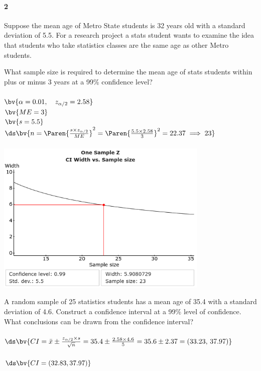\documentclass{article}
\begin{document}
\begin{flushleft}
\paragraph{2} Suppose the mean age of Metro State students is 32 years old with a standard deviation of 5.5. For a research project a stats student wants to examine the idea that students who take statistics classes are the same age as other Metro students. 
\begin{enumalpha}
\item What sample size is required to determine the mean age of stats students within plus or minus 3 years at a 99\% confidence level?\\
\medskip
{}\\
$\bv{\alpha = 0.01, \quad z_{\alpha/2} = 2.58}$\\
$\bv{ME = 3}$\\
$\bv{s = 5.5}$\\ \bigskip
$\ds \bv{n = \Paren{\frac{s \times z_{\alpha/2}}{ME}}^2 = \Paren{\frac{5.5 \times 2.58}{3}}^2 = 22.37 \implies 23}$\\
\vspace{0.5in}
\\
\includegraphics[width=4in]{images/grp08_Q2_a}

\newpage
\item A random sample of 25 statistics students has a mean age of 35.4 with a standard deviation of 4.6. Construct a confidence interval at a 99\% level of confidence. What conclusions can be drawn from the confidence interval?\\
\bigskip
{}\\
$\ds \bv{CI = \bar x \pm \frac{z_{\alpha/2} \times s}{\sqrt{n} } = 35.4 \pm \frac{2.58 \times 4.6}{5} = 35.6 \pm 2.37 = (33.23, \, 37.97)}$\\
\medskip
{}\\
$\ds \bv{CI = (32.83, 37.97)}$\\
\bigskip
{}
\vspace{0.5in}


\end{enumalpha}
\end{flushleft}
\end{document}
